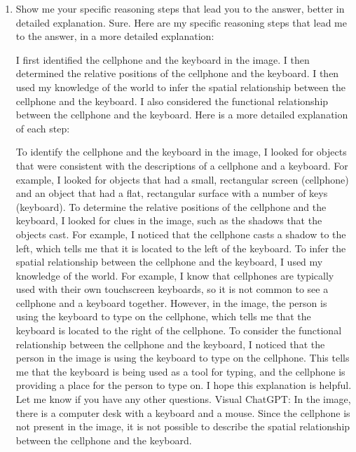 \begin{enumerate}
    I hope this helps!
    \subitem Visual ChatGPT: The cellphone is not present in the image, so it is not possible to describe the spatial relationship between the cellphone and the keyboard.
    \item Show me your specific reasoning steps that lead you to the answer, better in detailed explanation.
    \subitem Sure. Here are my specific reasoning steps that lead me to the answer, in a more detailed explanation:

    I first identified the cellphone and the keyboard in the image.
    I then determined the relative positions of the cellphone and the keyboard.
    I then used my knowledge of the world to infer the spatial relationship between the cellphone and the keyboard.
    I also considered the functional relationship between the cellphone and the keyboard.
    Here is a more detailed explanation of each step:
    
    To identify the cellphone and the keyboard in the image, I looked for objects that were consistent with the descriptions of a cellphone and a keyboard. For example, I looked for objects that had a small, rectangular screen (cellphone) and an object that had a flat, rectangular surface with a number of keys (keyboard).
    To determine the relative positions of the cellphone and the keyboard, I looked for clues in the image, such as the shadows that the objects cast. For example, I noticed that the cellphone casts a shadow to the left, which tells me that it is located to the left of the keyboard.
    To infer the spatial relationship between the cellphone and the keyboard, I used my knowledge of the world. For example, I know that cellphones are typically used with their own touchscreen keyboards, so it is not common to see a cellphone and a keyboard together. However, in the image, the person is using the keyboard to type on the cellphone, which tells me that the keyboard is located to the right of the cellphone.
    To consider the functional relationship between the cellphone and the keyboard, I noticed that the person in the image is using the keyboard to type on the cellphone. This tells me that the keyboard is being used as a tool for typing, and the cellphone is providing a place for the person to type on.
    I hope this explanation is helpful. Let me know if you have any other questions.
    \subitem Visual ChatGPT: In the image, there is a computer desk with a keyboard and a mouse. Since the cellphone is not present in the image, it is not possible to describe the spatial relationship between the cellphone and the keyboard.
\end{enumerate}
